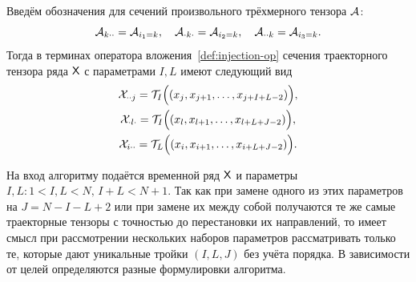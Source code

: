 \documentclass[specialist,
  substylefile=spbu_report.rtx,
subf,href,colorlinks=true, 12pt]{disser}
\theoremstyle{plain}
\theoremstyle{definition}
\theoremstyle{remark}
\begin{document}
Введём обозначения для сечений произвольного трёхмерного тензора $\mathcal{A}$:
\[
  \mathcal{A}_{k \cdot \cdot} = \mathcal{A}_{i_1=k}, \quad
  \mathcal{A}_{\cdot k \cdot} = \mathcal{A}_{i_2=k}, \quad
  \mathcal{A}_{\cdot \cdot k} = \mathcal{A}_{i_3=k}.
\]
Тогда в терминах оператора вложения~\ref{def:injection-op} сечения
траекторного тензора ряда $\mathsf{X}$
с параметрами $I, L$ имеют следующий вид
\begin{gather*}
  \mathcal{X}_{\cdot \cdot j}= \mathcal{T}_I \Big((x_j, x_{j+1}, \ldots,
  x_{j+I+L-2})\Big),\\
  \mathcal{X}_{\cdot l \cdot}= \mathcal{T}_I \Big((x_l, x_{l+1}, \ldots,
  x_{l+L+J-2})\Big),\\
  \mathcal{X}_{i\cdot \cdot}=\mathcal{T}_L \Big((x_i, x_{i+1}, \ldots,
  x_{i+L+J-2})\Big).
\end{gather*}

На вход алгоритму подаётся временной ряд $\mathsf{X}$ и параметры $I,L: 1<
I,L < N,\, I + L < N + 1$.
Так как при замене одного из этих параметров на $J=N-I-L+2$ или при
замене их между собой получаются
те же самые траекторные тензоры с точностью до перестановки их
направлений, то имеет смысл при
рассмотрении нескольких наборов параметров рассматривать только те,
которые дают уникальные тройки $(I, L, J)$
без учёта порядка.
В зависимости от целей определяются разные формулировки алгоритма.
\end{document}
